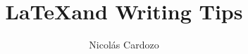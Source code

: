 \documentclass[12pt, a4paper, draft]{article}
\begin{document}
\title{\LaTeX and Writing Tips}
\author{Nicolás Cardozo}
\maketitle









\printbibliography
\end{document}

